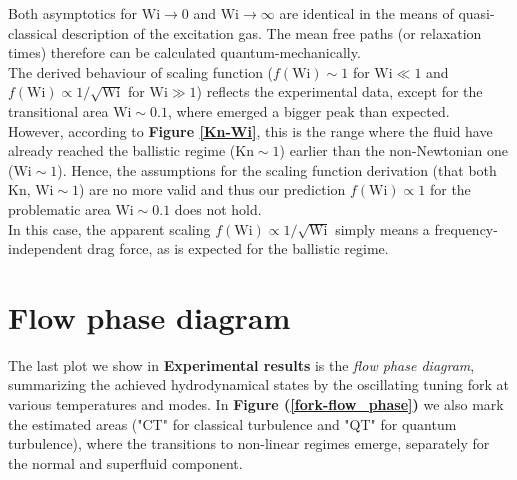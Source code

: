 Both asymptotics for $\text{Wi} \rightarrow 0$ and $\text{Wi} \rightarrow \infty$ are identical in the means of quasi-classical description of the excitation gas.
The mean free paths (or relaxation times) therefore can be calculated quantum-mechanically.\\
The derived behaviour of scaling function ($f(\text{Wi}) \sim 1$ for $\text{Wi} \ll 1$ and $f(\text{Wi}) \propto 1/\sqrt{\text{Wi}}$ for $\text{Wi} \gg 1$) reflects the experimental data, except for the transitional area $\text{Wi} \sim 0.1 $, where emerged a bigger peak than expected.\\
However, according to \textbf{Figure \ref{Kn-Wi}}, this is the range where the fluid have already reached the ballistic regime ($\text{Kn} \sim 1$) earlier than the non-Newtonian one ($\text{Wi} \sim 1$).
Hence, the assumptions for the scaling function derivation (that both $\text{Kn, Wi} \sim 1$) are no more valid and thus our prediction $f(\text{Wi}) \propto 1$ for the problematic area $\text{Wi} \sim 0.1$ does not hold.\\
In this case, the apparent scaling $f(\text{Wi}) \propto 1/\sqrt{\text{Wi}}$ simply means a frequency-independent drag force, as is expected for the ballistic regime.

\section{Flow phase diagram}

The last plot we show in \textbf{Experimental results} is the \textit{flow phase diagram}, summarizing the achieved hydrodynamical states by the oscillating tuning fork at various temperatures and modes. In \textbf{Figure (\ref{fork-flow_phase})} we also mark the estimated areas ("CT" for classical turbulence and "QT" for quantum turbulence), where the transitions to non-linear regimes emerge, separately for the normal and superfluid component.

